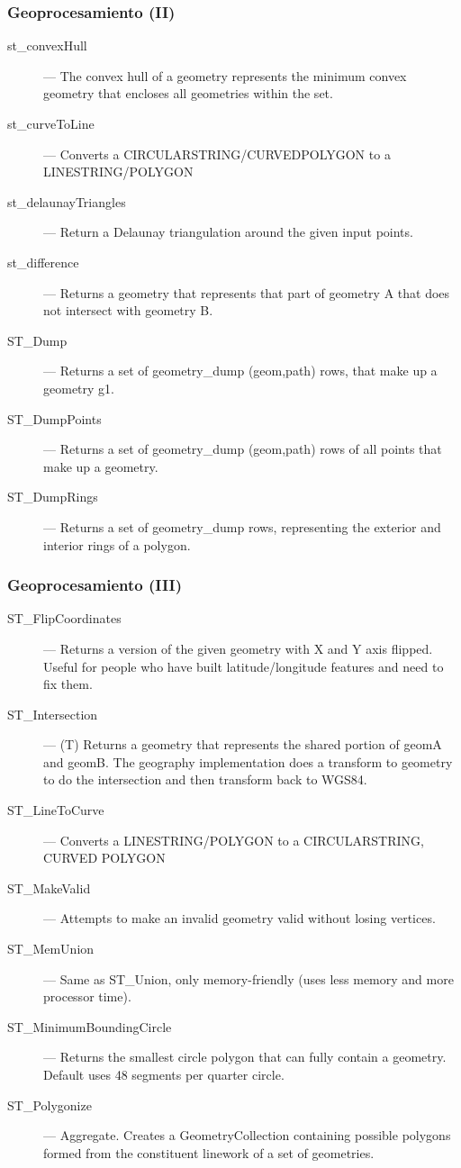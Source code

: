 \documentclass{classes/beamer_GeomaticaUA}
\begin{document}
\begin{frame}[fragile]
\frametitle{Geoprocesamiento (II)}
\begin{description}
\item[st\_convexHull] — The convex hull of a geometry represents the minimum convex geometry that encloses all geometries within the set.
\item[st\_curveToLine] — Converts a CIRCULARSTRING/CURVEDPOLYGON to a LINESTRING/POLYGON
\item[st\_delaunayTriangles] — Return a Delaunay triangulation around the given input points.
\item[st\_difference] — Returns a geometry that represents that part of geometry A that does not intersect with geometry B.
\item[ST\_Dump] — Returns a set of geometry\_dump (geom,path) rows, that make up a geometry g1.
\item[ST\_DumpPoints] — Returns a set of geometry\_dump (geom,path) rows of all points that make up a geometry.
\item[ST\_DumpRings] — Returns a set of geometry\_dump rows, representing the exterior and interior rings of a polygon.
\end{description}
\end{frame}

\begin{frame}[fragile]
\frametitle{Geoprocesamiento (III)}
\begin{description}
\item[ST\_FlipCoordinates] — Returns a version of the given geometry with X and Y axis flipped. Useful for people who have built latitude/longitude features and need to fix them.
\item[ST\_Intersection] — (T) Returns a geometry that represents the shared portion of geomA and geomB. The geography implementation does a transform to geometry to do the intersection and then transform back to WGS84.
\item[ST\_LineToCurve ]— Converts a LINESTRING/POLYGON to a CIRCULARSTRING, CURVED POLYGON
\item[ST\_MakeValid] — Attempts to make an invalid geometry valid without losing vertices.
\item[ST\_MemUnion] — Same as ST\_Union, only memory-friendly (uses less memory and more processor time).
\item[ST\_MinimumBoundingCircle] — Returns the smallest circle polygon that can fully contain a geometry. Default uses 48 segments per quarter circle.
\item[ST\_Polygonize] — Aggregate. Creates a GeometryCollection containing possible polygons formed from the constituent linework of a set of geometries.

\end{description}
\end{frame}
\end{document}
